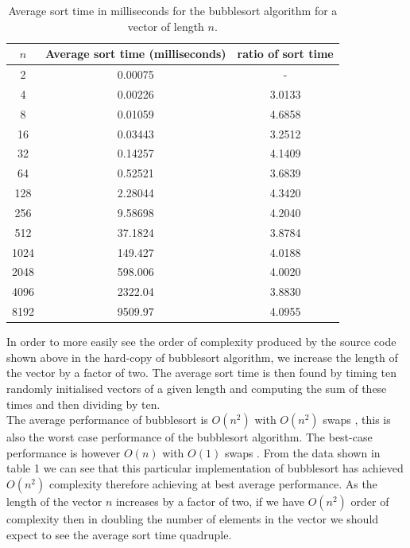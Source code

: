 \documentclass[a4paper, 12pt]{article}
\begin{document}
\begin{table} [H]
\centering
\begin{tabular}{ c | c | c}
$n$ & Average sort time (milliseconds)  & ratio of sort time \\ \hline
         2      &       0.00075  & -\\
         4       &      0.00226 & 3.0133 \\
         8        &     0.01059 & 4.6858 \\
        16        &     0.03443 & 3.2512\\
        32        &     0.14257 &  4.1409\\
        64         &    0.52521 & 3.6839\\
       128        &     2.28044 & 4.3420\\
       256        &     9.58698 & 4.2040 \\
       512        &     37.1824 & 3.8784\\
      1024       &      149.427 & 4.0188\\
      2048       &      598.006 & 4.0020\\
      4096       &      2322.04 & 3.8830 \\
      8192       &      9509.97 & 4.0955 \\
\end{tabular}
\caption{Average sort time in milliseconds for the bubblesort algorithm for a vector of length $n$.}
\end{table}
In order to more easily see the order of complexity produced by the source code shown above in the hard-copy of bubblesort algorithm, we increase the length of the vector by a factor of two. The average sort time is then found by timing ten randomly initialised vectors of a given length and computing the sum of these times and then dividing by ten. \\

The average performance of bubblesort is $O(n^2)$ with $O(n^2)$ swaps , this is also the worst case performance of the bubblesort algorithm. The best-case performance is however $O(n)$ with $O(1)$ swaps \cite{BlackPE}. From the data shown in table 1 we can see that this particular implementation of bubblesort has achieved $O(n^2)$ complexity therefore achieving at best average performance. As the length of the vector $n$ increases by a factor of two, if we have $O(n^2)$ order of complexity then in doubling the number of elements in the vector we should expect to see the average sort time quadruple. \\
\end{document}
